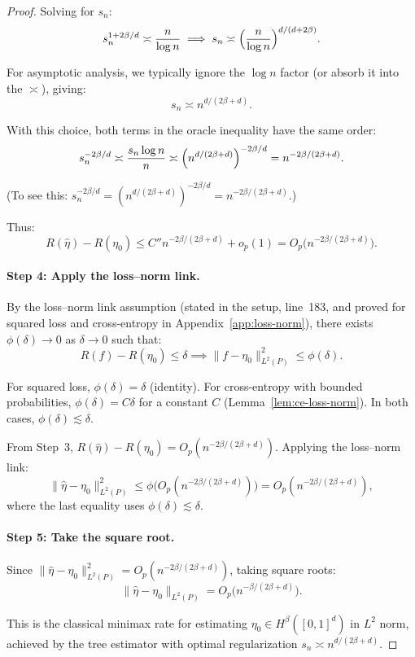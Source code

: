 \begin{proof}
Solving for $s_n$:
\[
s_n^{1 + 2\beta/d} \asymp \frac{n}{\log n} \implies s_n \asymp \Bigl( \frac{n}{\log n} \Bigr)^{d/(d + 2\beta)}.
\]

For asymptotic analysis, we typically ignore the $\log n$ factor (or absorb it into the $\asymp$), giving:
\[
s_n \asymp n^{d/(2\beta + d)}.
\]

With this choice, both terms in the oracle inequality have the same order:
\[
s_n^{-2\beta/d} \asymp \frac{s_n \log n}{n} \asymp \Bigl( n^{d/(2\beta+d)} \Bigr)^{-2\beta/d} = n^{-2\beta/(2\beta+d)}.
\]

(To see this: $s_n^{-2\beta/d} = (n^{d/(2\beta+d)})^{-2\beta/d} = n^{-2\beta/(2\beta+d)}$.)

Thus:
\[
R(\hat\eta) - R(\eta_0) \le C'' n^{-2\beta/(2\beta+d)} + o_p(1) = O_p\bigl( n^{-2\beta/(2\beta+d)} \bigr).
\]

\paragraph{Step 4: Apply the loss--norm link.}
By the loss--norm link assumption (stated in the setup, line~183, and proved for squared loss and cross-entropy in Appendix~\ref{app:loss-norm}), there exists $\phi(\delta) \to 0$ as $\delta \to 0$ such that:
\[
R(f) - R(\eta_0) \le \delta \implies \|f - \eta_0\|_{L^2(P)}^2 \le \phi(\delta).
\]

For squared loss, $\phi(\delta) = \delta$ (identity). For cross-entropy with bounded probabilities, $\phi(\delta) = C\delta$ for a constant $C$ (Lemma~\ref{lem:ce-loss-norm}). In both cases, $\phi(\delta) \lesssim \delta$.

From Step~3, $R(\hat\eta) - R(\eta_0) = O_p(n^{-2\beta/(2\beta+d)})$. Applying the loss--norm link:
\[
\|\hat\eta - \eta_0\|_{L^2(P)}^2 \le \phi\bigl( O_p(n^{-2\beta/(2\beta+d)}) \bigr) = O_p(n^{-2\beta/(2\beta+d)}),
\]
where the last equality uses $\phi(\delta) \lesssim \delta$.

\paragraph{Step 5: Take the square root.}
Since $\|\hat\eta - \eta_0\|_{L^2(P)}^2 = O_p(n^{-2\beta/(2\beta+d)})$, taking square roots:
\[
\|\hat\eta - \eta_0\|_{L^2(P)} = O_p\bigl( n^{-\beta/(2\beta+d)} \bigr).
\]

This is the classical minimax rate for estimating $\eta_0 \in H^\beta([0,1]^d)$ in $L^2$ norm, achieved by the tree estimator with optimal regularization $s_n \asymp n^{d/(2\beta+d)}$.


\end{proof}
